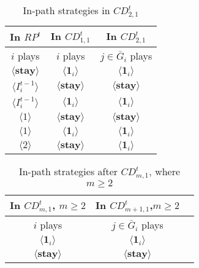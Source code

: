 \documentclass[12pt,letter]{article}
\theoremstyle{definition}
\theoremstyle{remark}
\theoremstyle{claim}
\begin{document}
\begin{table}[t]
\caption{In-path strategies in $CD^t_{2,1}$}
\label{Table_stg_cdt21}
\begin{center}
\begin{tabular}{c c c}
In $RP^t$ 	 	&  	In $CD^t_{1,1}$		&  In $CD^t_{2,1}$	\\
\hline
\hline
$i$ plays 		  							&  	$i$ plays									& $j\in \bar{G}_{i}$ plays  \\
\hline
$\langle  \textbf{stay} \rangle$ 	& 	$\langle \mathbf{1}_i \rangle$	    & $\langle \mathbf{1}_i \rangle$ \\
$\langle  {I^{t-1}_i} \rangle$ 		&  $\langle \textbf{stay} \rangle$		& $\langle \textbf{stay} \rangle$     \\
$\langle  {I^{t-1}_i} \rangle$ 		&  $\langle \mathbf{1}_i \rangle$		& $\langle \mathbf{1}_i \rangle$     \\
$\langle 1 \rangle$ 		             &  $\langle \textbf{stay} \rangle$		& $\langle \textbf{stay} \rangle$  \\
$\langle 1 \rangle$ 		             &  $\langle \mathbf{1}_i \rangle$		&  $\langle \mathbf{1}_i \rangle$ \\
$\langle 2 \rangle$ 		             &  $\langle \textbf{stay} \rangle$		&  $\langle \mathbf{1}_i \rangle$ 
\end{tabular}
\end{center}
\end{table}

\begin{table}[t]
\caption{In-path strategies after $CD^t_{m,1}$, where $m\geq 2$}
\label{Table_stg_cdtm1}
\begin{center}
\begin{tabular}{c c c}
In $CD^t_{m,1}$, $m\geq 2$ 	 	&  	In $CD^t_{m+1,1}$,$m\geq 2$		& 	\\
\hline
\hline
$i$ plays 		  							&  $j\in \bar{G}_{i}$ plays  								& \\
\hline
$\langle \mathbf{1}_i \rangle$ 	& 	$\langle \mathbf{1}_i \rangle$	    &  \\
$\langle \textbf{stay} \rangle$		&  $\langle \textbf{stay} \rangle$	&  \\

\end{tabular}
\end{center}
\end{table}
\end{document}
